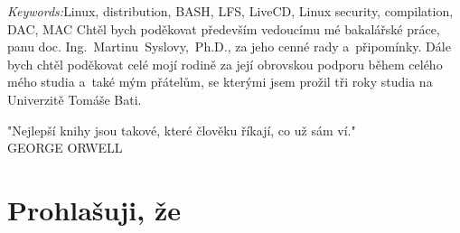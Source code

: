 \documentclass[a4paper,12pt]{article}
\newcommand{\nmm}[1]{\section*{#1}} %
\begin{document}
\emph{Keywords:}Linux, distribution, BASH, LFS, LiveCD, Linux security, compilation, DAC, MAC
\clearpage
\thispagestyle{empty}
Chtěl bych poděkovat především vedoucímu mé bakalářské práce, panu doc. Ing.~Martinu~Syslovy,~Ph.D., za jeho cenné rady a~připomínky.
Dále bych chtěl poděkovat celé mojí rodině za její obrovskou podporu během celého mého studia a~také mým přátelům, se kterými jsem prožil tři roky studia na Univerzitě Tomáše Bati.

\vspace{3cm}
"Nejlepší knihy jsou takové, které člověku říkají, co už sám ví."\\

\hspace{9cm}GEORGE ORWELL
\clearpage
\thispagestyle{empty}
\clearpage
\nmm{Prohlašuji, že}
\end{document}

